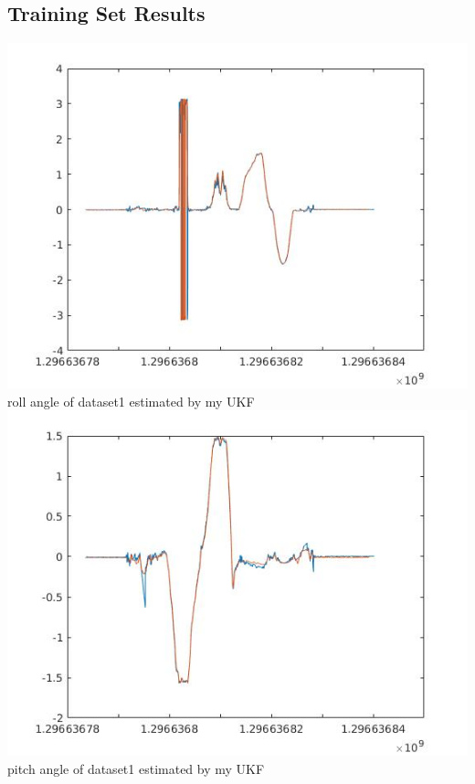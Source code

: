 \documentclass[english]{article}
\begin{document}
\subsection*{Training Set Results}
\includegraphics[scale = 0.7]{roll_kalman1.jpg}\\
roll angle of dataset1 estimated by my UKF\\
\includegraphics[scale = 0.7]{pitch_kalman1.jpg}\\
pitch angle of dataset1 estimated by my UKF\\
\end{document}
